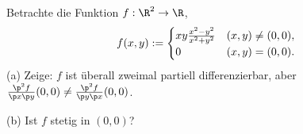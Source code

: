 \begin{prob}
Betrachte die Funktion $f:\R^2\to\R$,
$$
  f(x,y) := \begin{cases}
     xy\frac{x^2-y^2}{x^2+y^2} & (x,y)\neq(0,0), \cr
     0 & (x,y)=(0,0).
  \end{cases}
$$
(a) Zeige: $f$ ist \"uberall zweimal partiell differenzierbar, aber
$\frac{\p^2 f}{\p x\p y}(0,0)\neq \frac{\p^2 f}{\p y\p x}(0,0)$.

(b) Ist $f$ stetig in $(0,0)$?  
\end{prob}
